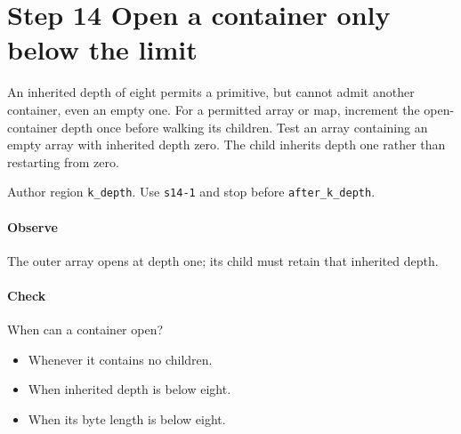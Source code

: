 \section{Step 14 Open a container only below the limit}\label{cbor-s14}
An inherited depth of eight permits a primitive, but cannot admit another container, even an empty one. For a permitted array or map, increment the open-container depth once before walking its children. Test an array containing an empty array with inherited depth zero. The child inherits depth one rather than restarting from zero.

Author region \texttt{k\_depth}. Use \texttt{s14-1} and stop before \texttt{after\_k\_depth}.

\paragraph{Observe} The outer array opens at depth one; its child must retain that inherited depth.

\paragraph{Check} When can a container open?
\begin{itemize}
\item[A.] Whenever it contains no children.
\item[B.] When inherited depth is below eight.
\item[C.] When its byte length is below eight.
\end{itemize}
